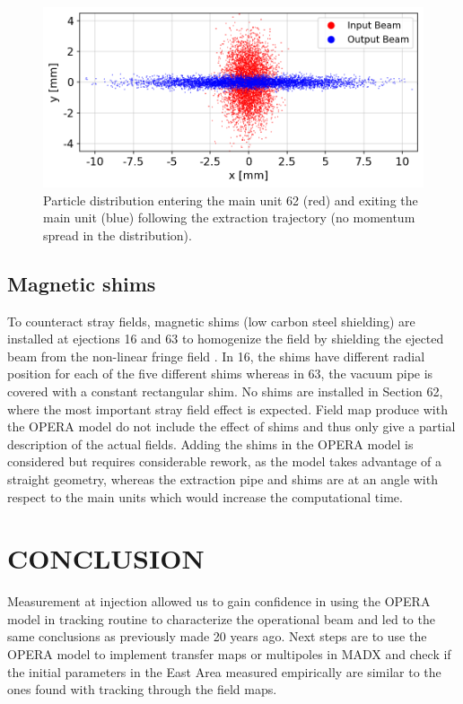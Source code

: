 \documentclass[a4paper,
               biblatex,     %
               keeplastbox,   %
               ]{jacow}
\begin{document}
\begin{figure}[!htb]
   \centering
   \includegraphics*[width=1.0\columnwidth]{particle_distribution.png}
   \caption{Particle distribution entering the main unit 62 (red) and exiting the main unit (blue) following the extraction trajectory (no momentum spread in the distribution).}
   \label{fig:particle_distribution}
\end{figure}

\subsection{Magnetic shims}

To counteract stray fields, magnetic shims (low carbon steel shielding) are installed at ejections 16 and 63 to homogenize the field by shielding the ejected beam from the non-linear fringe field \cite{zickler_influence_nodate}. In 16, the shims have different radial position for each of the five different shims whereas in 63, the vacuum pipe is covered with a constant rectangular shim. No shims are installed in Section 62, where the most important stray field effect is expected. Field map produce with the OPERA model do not include the effect of shims and thus only give a partial description of the actual fields. Adding the shims in the OPERA model is considered but requires considerable rework, as the model takes advantage of a straight geometry, whereas the extraction pipe and shims are at an angle with respect to the main units which would increase the computational time.


\section{CONCLUSION}
Measurement at injection allowed us to gain confidence in using the OPERA model in tracking routine to characterize the operational beam and led to the same conclusions as previously made 20 years ago. Next steps are to use the OPERA model to implement transfer maps or multipoles in MADX and check if the initial parameters in the East Area measured empirically are similar to the ones found with tracking through the field maps.

\printbibliography
\end{document}
